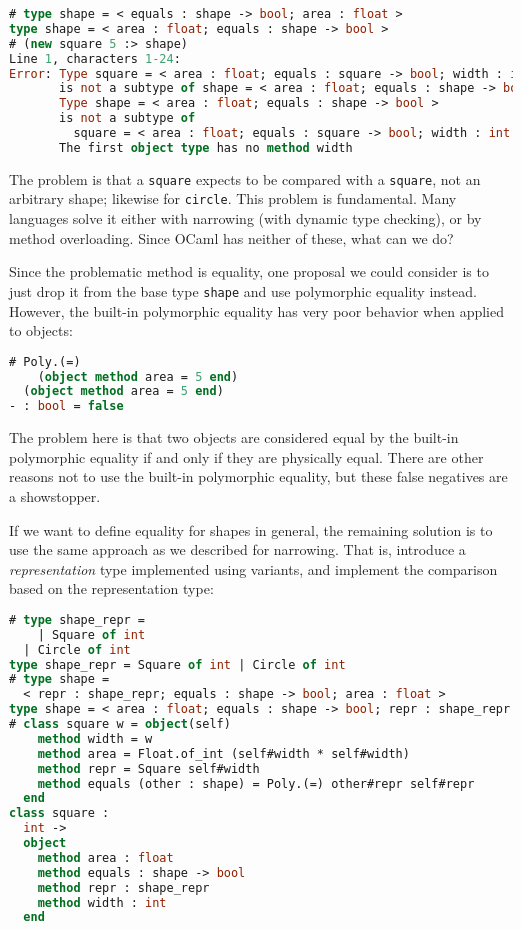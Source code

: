 \begin{lstlisting}[language=Caml]
# type shape = < equals : shape -> bool; area : float >
type shape = < area : float; equals : shape -> bool >
# (new square 5 :> shape)
Line 1, characters 1-24:
Error: Type square = < area : float; equals : square -> bool; width : int >
       is not a subtype of shape = < area : float; equals : shape -> bool >
       Type shape = < area : float; equals : shape -> bool >
       is not a subtype of
         square = < area : float; equals : square -> bool; width : int >
       The first object type has no method width
\end{lstlisting}

The problem is that a \passthrough{\lstinline!square!} expects to be
compared with a \passthrough{\lstinline!square!}, not an arbitrary
shape; likewise for \passthrough{\lstinline!circle!}. This problem is
fundamental. Many languages solve it either with narrowing (with dynamic
type checking), or by method overloading. Since OCaml has neither of
these, what can we do?

Since the problematic method is equality, one proposal we could consider
is to just drop it from the base type \passthrough{\lstinline!shape!}
and use polymorphic equality instead. However, the built-in polymorphic
equality has very poor behavior when applied to objects:

\begin{lstlisting}[language=Caml]
# Poly.(=)
    (object method area = 5 end)
  (object method area = 5 end)
- : bool = false
\end{lstlisting}

The problem here is that two objects are considered equal by the
built-in polymorphic equality if and only if they are physically equal.
There are other reasons not to use the built-in polymorphic equality,
but these false negatives are a showstopper.

If we want to define equality for shapes in general, the remaining
solution is to use the same approach as we described for narrowing. That
is, introduce a \emph{representation} type implemented using variants,
and implement the comparison based on the representation type:

\begin{lstlisting}[language=Caml]
# type shape_repr =
    | Square of int
  | Circle of int
type shape_repr = Square of int | Circle of int
# type shape =
  < repr : shape_repr; equals : shape -> bool; area : float >
type shape = < area : float; equals : shape -> bool; repr : shape_repr >
# class square w = object(self)
    method width = w
    method area = Float.of_int (self#width * self#width)
    method repr = Square self#width
    method equals (other : shape) = Poly.(=) other#repr self#repr
  end
class square :
  int ->
  object
    method area : float
    method equals : shape -> bool
    method repr : shape_repr
    method width : int
  end
\end{lstlisting}

